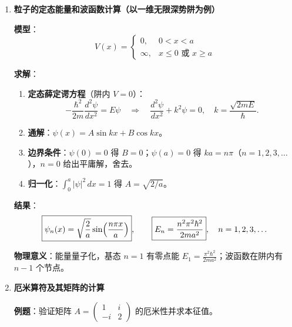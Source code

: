 \begin{enumerate}[label=\textbf{\arabic*.}, leftmargin=2em, itemsep=0.8em]

\item \textbf{粒子的定态能量和波函数计算（以一维无限深势阱为例）}

\textbf{模型}：
\[
    V(x) = \begin{cases} 0, & 0 < x < a \\ \infty, & x \le 0 \text{ 或 } x \ge a \end{cases}
\]

\textbf{求解}：
\begin{enumerate}[nosep, label=Step \arabic*.]
    \item \textbf{定态薛定谔方程}（阱内 $V=0$）：
    \[
        -\frac{\hbar^2}{2m}\frac{d^2\psi}{dx^2} = E\psi \quad\Longrightarrow\quad
        \frac{d^2\psi}{dx^2} + k^2\psi = 0, \quad k = \frac{\sqrt{2mE}}{\hbar}.
    \]
    \item \textbf{通解}：$\psi(x) = A\sin kx + B\cos kx$。
    \item \textbf{边界条件}：$\psi(0) = 0$ 得 $B=0$；$\psi(a) = 0$ 得 $ka = n\pi$（$n=1,2,3,\dots$），$n=0$ 给出平庸解，舍去。
    \item \textbf{归一化}：$\int_0^a |\psi|^2\,dx = 1$ 得 $A = \sqrt{2/a}$。
\end{enumerate}

\textbf{结果}：
\[
    \boxed{\psi_n(x) = \sqrt{\frac{2}{a}}\sin\Bigl(\frac{n\pi x}{a}\Bigr)}, \qquad
    \boxed{E_n = \frac{n^2\pi^2\hbar^2}{2ma^2}}, \quad n=1,2,3,\dots
\]

\textbf{物理意义}：能量量子化，基态 $n=1$ 有零点能 $E_1 = \frac{\pi^2\hbar^2}{2ma^2}$；波函数在阱内有 $n-1$ 个节点。

\item \textbf{厄米算符及其矩阵的计算}

\textbf{例题}：验证矩阵 $A = \begin{pmatrix} 1 & i \\ -i & 2 \end{pmatrix}$ 的厄米性并求本征值。


\end{enumerate}
